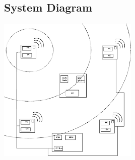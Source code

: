 \documentclass{article}
\begin{document}
\subsection*{System Diagram}
\includegraphics[width=0.5\textwidth]{system}
\end{document}
